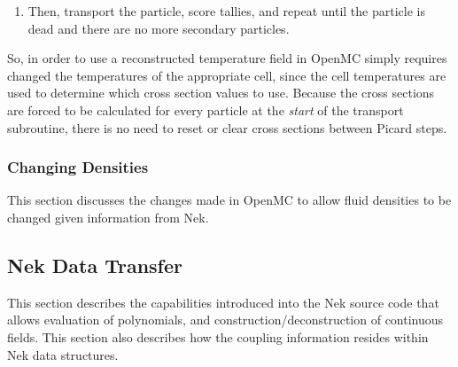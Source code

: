 \documentclass[10pt]{article}
\numberwithin{equation}{section} %
\begin{document}
\begin{enumerate}

\item Then, transport the particle, score tallies, and repeat until the particle is dead and there are no more secondary particles.
\end{enumerate}


So, in order to use a reconstructed temperature field in OpenMC simply requires changed the temperatures of the appropriate cell, since the cell temperatures are used to determine which cross section values to use. Because the cross sections are forced to be calculated for every particle at the {\it start} of the transport subroutine, there is no need to reset or clear cross sections between Picard steps. 

\subsubsection{Changing Densities}
This section discusses the changes made in OpenMC to allow fluid densities to be changed given information from Nek. 

\subsection{Nek Data Transfer}
\label{sec:NekTransfer}
This section describes the capabilities introduced into the Nek source code that allows evaluation of polynomials, and construction/deconstruction of continuous fields. This section also describes how the coupling information resides within Nek data structures.
\end{document}
